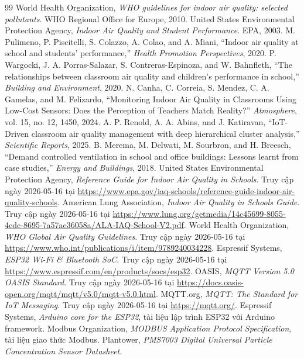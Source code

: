\cleardoublepage
{}
{}
\renewcommand{\bibname}{Tài liệu tham khảo}
\begin{thebibliography}{99}
     World Health Organization, \textit{WHO guidelines for indoor air quality: selected pollutants}. WHO Regional Office for Europe, 2010.
     United States Environmental Protection Agency, \textit{Indoor Air Quality and Student Performance}. EPA, 2003.
     M. Pulimeno, P. Piscitelli, S. Colazzo, A. Colao, and A. Miani, ``Indoor air quality at school and students' performance,'' \textit{Health Promotion Perspectives}, 2020.
     P. Wargocki, J. A. Porras-Salazar, S. Contreras-Espinoza, and W. Bahnfleth, ``The relationships between classroom air quality and children's performance in school,'' \textit{Building and Environment}, 2020.
     N. Canha, C. Correia, S. Mendez, C. A. Gamelas, and M. Felizardo, ``Monitoring Indoor Air Quality in Classrooms Using Low-Cost Sensors: Does the Perception of Teachers Match Reality?'' \textit{Atmosphere}, vol. 15, no. 12, 1450, 2024.
     A. P. Renold, A. A. Abins, and J. Katiravan, ``IoT-Driven classroom air quality management with deep hierarchical cluster analysis,'' \textit{Scientific Reports}, 2025.
     B. Merema, M. Delwati, M. Sourbron, and H. Breesch, ``Demand controlled ventilation in school and office buildings: Lessons learnt from case studies,'' \textit{Energy and Buildings}, 2018.
     United States Environmental Protection Agency, \textit{Reference Guide for Indoor Air Quality in Schools}. Truy cập ngày 2026-05-16 tại \url{https://www.epa.gov/iaq-schools/reference-guide-indoor-air-quality-schools}.
     American Lung Association, \textit{Indoor Air Quality in Schools Guide}. Truy cập ngày 2026-05-16 tại \url{https://www.lung.org/getmedia/14c45699-8055-4cdc-8695-7a57ae36058a/ALA-IAQ-School-V2.pdf}.
     World Health Organization, \textit{WHO Global Air Quality Guidelines}. Truy cập ngày 2026-05-16 tại \url{https://www.who.int/publications/i/item/9789240034228}.
     Espressif Systems, \textit{ESP32 Wi-Fi \& Bluetooth SoC}. Truy cập ngày 2026-05-16 tại \url{https://www.espressif.com/en/products/socs/esp32}.
     OASIS, \textit{MQTT Version 5.0 OASIS Standard}. Truy cập ngày 2026-05-16 tại \url{https://docs.oasis-open.org/mqtt/mqtt/v5.0/mqtt-v5.0.html}.
     MQTT.org, \textit{MQTT: The Standard for IoT Messaging}. Truy cập ngày 2026-05-16 tại \url{https://mqtt.org/}.
     Espressif Systems, \textit{Arduino core for the ESP32}, tài liệu lập trình ESP32 với Arduino framework.
     Modbus Organization, \textit{MODBUS Application Protocol Specification}, tài liệu giao thức Modbus.
     Plantower, \textit{PMS7003 Digital Universal Particle Concentration Sensor Datasheet}.
\end{thebibliography}
